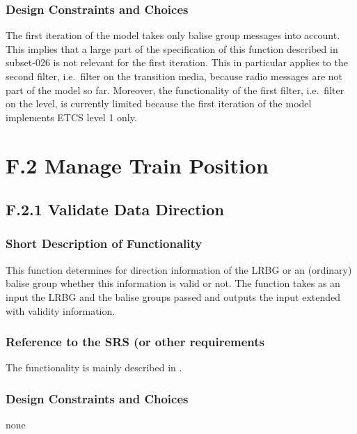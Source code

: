 \documentclass{template/openetcs_report}
\begin{document}
\subsubsection{Design Constraints and Choices}
The first iteration of the model takes only balise group messages into account. This implies that a large part of the specification of this function described in subset-026 \cite{subset-026} is not relevant for the first iteration. This in particular applies to the second filter, i.e.~filter on the transition media, because radio messages are not part of the model so far. Moreover, the functionality of the first filter, i.e.~filter on the level, is currently  limited because the first iteration of the model implements ETCS level 1 only.

\section{F.2 Manage Train Position}


\subsection{F.2.1 Validate Data Direction}

\subsubsection{Short Description of Functionality}
This function determines for direction information of the LRBG or an (ordinary) balise group whether this information is valid or not. The function takes as an input the LRBG and the balise groups passed and outputs the input extended with validity information.

\subsubsection{Reference to the SRS (or other requirements}
The functionality is mainly described in \cite[Chapter~3.6.3]{subset-026}.

\subsubsection{Design Constraints and Choices}
none



\appendix


%
%
%
%


\newpage
{}
\printindex

\end{document}
